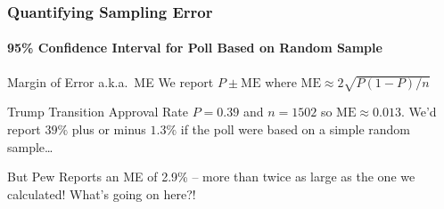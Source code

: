 %
%
\begin{frame}
\frametitle{Quantifying Sampling Error}
\framesubtitle{95\% Confidence Interval for Poll Based on Random Sample}

\begin{block}{Margin of Error a.k.a.\ ME}
  We report $P \pm \mbox{ME}$ where $\mbox{ME} \approx 2 \sqrt{P(1-P)/n}$
\end{block}

\pause

\begin{block}{Trump Transition Approval Rate}
$P = 0.39$ and $n = 1502$ so $\mbox{ME} \approx 0.013$.  We'd report $39\%$ plus or minus $1.3\%$ if the poll were based on a simple random sample\dots
\end{block}

\vspace{1em}

\pause

\alert{But Pew Reports an ME of 2.9\% -- more than twice as large as the one we calculated! What's going on here?!}

\end{frame}

